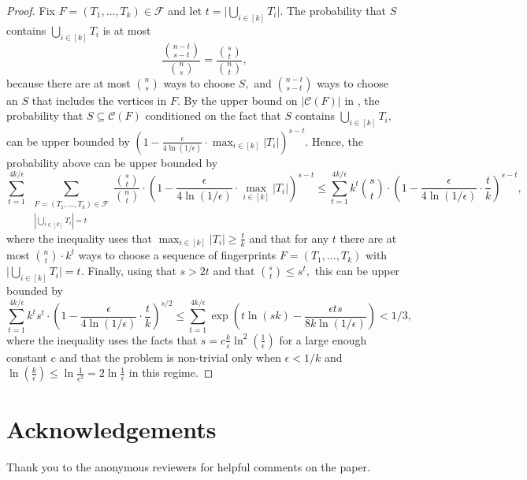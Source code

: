 \documentclass[11pt]{article}
\begin{document}
\begin{proof}
Fix $F=(T_1,\dots,T_k) \in \mathcal{F}$ and let $t = \big| \bigcup_{i \in [k]} T_i \big|$.
The probability that $S$ contains $\bigcup_{i \in [k]}T_i$ is at most
\[\frac{\binom{n-t}{s-t}}{\binom{n}{s}} = \frac{\binom{s}{t}}{\binom{n}{t}},\]
because there are at most $\binom{n}{s}$ ways to choose $S,$ and $\binom{n-t}{s-t}$ ways to choose an $S$ that includes the vertices in $F.$
By the upper bound on $|\mathcal{C}(F)|$ in , the probability that $S \subseteq \mathcal{C}(F)$ conditioned on the fact that $S$ contains $\bigcup_{i \in [k]}T_i,$ can be upper bounded by $ \left( 1 - \frac{\epsilon}{4\ln (1/\epsilon)} \cdot \max_{i \in [k]} |T_i|\right)^{s-t}$.
Hence, the probability above can be upper bounded by
\[
    \sum_{t=1}^{4k/\epsilon} ~\sum_{\substack{F=(T_1,\dots,T_k) \in \mathcal{F}\\ | \bigcup_{i \in [k]} T_i | = t}} \frac{\binom{s}{t}}{\binom{n}{t}} \cdot \left( 1 - \frac{\epsilon}{4\ln (1/\epsilon)} \cdot \max_{i \in [k]} |T_i|\right)^{s-t}
    \leq \sum_{t=1}^{4k/\epsilon} k^t \binom{s}{t} \cdot \left( 1 - \frac{\epsilon}{4\ln (1/\epsilon)} \cdot \frac{t}{k}\right)^{s-t},
\]
where the inequality uses that $\max_{i \in [k]} |T_i| \geq \frac{t}{k}$ and that for any $t$ there are at most $\binom{n}{t} \cdot k^t$ ways to choose a sequence of fingerprints $F = (T_1,\dots,T_k)$ with $\big| \bigcup_{i \in [k]} T_i \big| = t.$
Finally, using that $s > 2t$ and that $\binom{s}{t} \leq s^t,$ this can be upper bounded by
\[\sum_{t=1}^{4k/\epsilon} k^t s^t \cdot \left( 1 - \frac{\epsilon}{4\ln (1/\epsilon)} \cdot \frac{t}{k}\right)^{s/2} \le \sum_{t=1}^{4k/\epsilon} \exp\left(t \ln(s k) - \frac{\epsilon t s}{8k\ln (1/\epsilon)}\right) < 1/3,\]
where the inequality uses the facts that $s = c\frac{k}{\epsilon} \ln^2\left(\frac{1}{\epsilon}\right)$ for a large enough constant $c$ and that the problem is non-trivial only when $\epsilon < 1/k$ and $\ln(\frac k\epsilon) \le \ln\frac1{\epsilon^2} = 2\ln \frac 1\epsilon$ in this regime.
\end{proof}

\section*{Acknowledgements}
Thank you to the anonymous reviewers for helpful comments on the paper.




\end{document}
